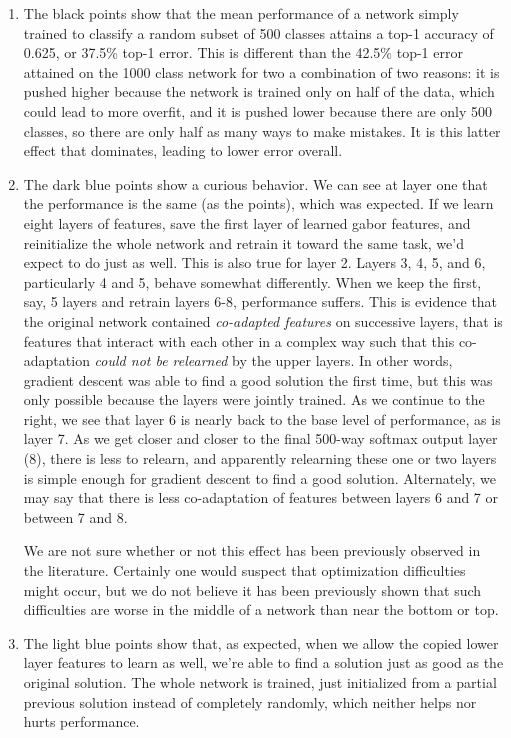 \begin{enumerate}

\item The black  points show that the mean performance of a network simply trained to classify a random subset of 500 classes attains a top-1 accuracy of 0.625, or 37.5\% top-1 error. This is different than the 42.5\% top-1 error attained on the 1000 class network for two a combination of two reasons: it is pushed higher because the network is trained only on half of the data, which could lead to more overfit, and it is pushed lower because there are only 500 classes, so there are only half as many ways to make mistakes. It is this latter effect that dominates, leading to lower error overall.

\item The dark blue  points show a curious behavior. We can see at layer one that the performance is the same (as the  points), which was expected. If we learn eight layers of features, save the first layer of learned gabor features, and reinitialize the whole network and retrain it toward the same task, we'd expect to do just as well. This is also true for layer 2. Layers 3, 4, 5, and 6, particularly 4 and 5, behave somewhat differently. When we keep the first, say, 5 layers and retrain layers 6-8, performance suffers. This is evidence that the original network contained \emph{co-adapted features} on successive layers, that is features that interact with each other in a complex way such that this co-adaptation \emph{could not be relearned} by the upper layers. In other words, gradient descent was able to find a good solution the first time, but this was only possible because the layers were jointly trained. As we continue to the right, we see that layer 6 is nearly back to the base level of performance, as is layer 7. As we get closer and closer to the final 500-way softmax output layer (8), there is less to relearn, and apparently relearning these one or two layers is simple enough for gradient descent to find a good solution. Alternately, we may say that there is less co-adaptation of features between layers 6 and 7 or between 7 and 8.

We are not sure whether or not this effect has been previously observed in the literature. Certainly one would suspect that optimization difficulties might occur, but we do not believe it has been previously shown that such difficulties are worse in the middle of a network than near the bottom or top.

\item The light blue  points show that, as expected, when we allow the copied lower layer features to learn as well, we're able to find a solution just as good as the original solution. The whole network is trained, just initialized from a partial previous solution instead of completely randomly, which neither helps nor hurts performance.


\end{enumerate}
